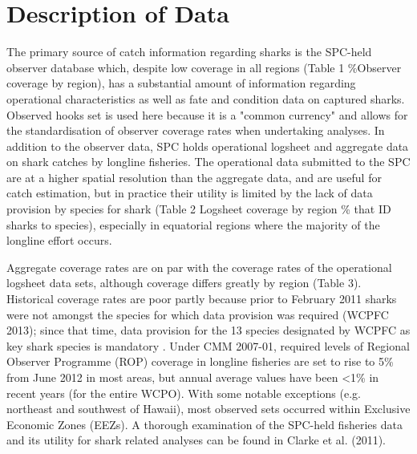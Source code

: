 \documentclass[12pt]{SCreport}
\begin{document}
\section{Description of Data}

The primary source of catch information regarding sharks is the SPC-held observer database which, despite low coverage in all regions (Table 1 \%Observer coverage by region), has a substantial amount of information regarding operational characteristics as well as fate and condition data on captured sharks. Observed hooks set is used here because it is a "common currency" and allows for the standardisation of observer coverage rates when undertaking analyses.  In addition to the observer data, SPC holds operational logsheet and aggregate data on shark catches by longline fisheries. The operational data submitted to the SPC are at a higher spatial resolution than the aggregate data, and are useful for catch estimation, but in practice their utility is limited by the lack of data provision by species for shark (Table 2 Logsheet coverage by region \% that ID sharks to species), especially in equatorial regions where the majority of the longline effort occurs.

Aggregate coverage rates are on par with the coverage rates of the operational logsheet data sets, although coverage differs greatly by region (Table 3). Historical coverage rates are poor partly because prior to February 2011 sharks were not amongst the species for which data provision was required (WCPFC 2013); since that time, data provision for the 13 species designated by WCPFC as key shark species is mandatory . Under CMM 2007-01, required levels of Regional Observer Programme (ROP) coverage in longline fisheries are set to rise to 5\% from June 2012 in most areas, but annual average values have been <1\% in recent years (for the entire WCPO). With some notable exceptions (e.g. northeast and southwest of Hawaii), most observed sets occurred within Exclusive Economic Zones (EEZs). A thorough examination of the SPC-held fisheries data and its utility for shark related analyses can be found in Clarke et al. (2011).
\end{document}
